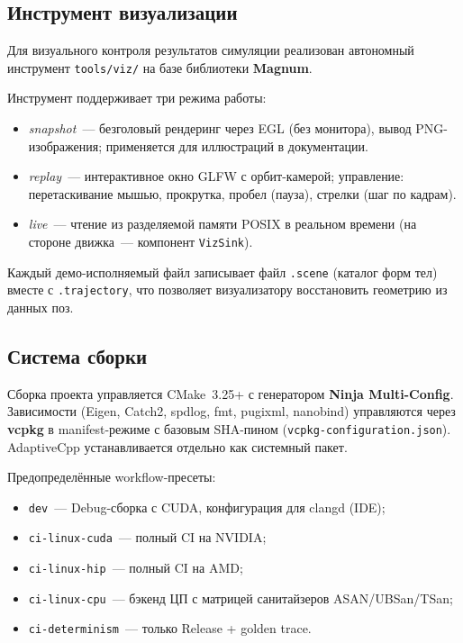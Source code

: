 \subsection{Инструмент визуализации}

Для визуального контроля результатов симуляции реализован автономный инструмент \texttt{tools/viz/} на базе 
библиотеки \textbf{Magnum}.

Инструмент поддерживает три режима работы:

\begin{itemize}
  \item \textit{snapshot}~--- безголовый рендеринг через EGL (без монитора),
    вывод PNG-изображения; применяется для иллюстраций в документации.
  \item \textit{replay}~--- интерактивное окно GLFW с орбит-камерой;
    управление: перетаскивание мышью, прокрутка, пробел (пауза), стрелки (шаг по кадрам).
  \item \textit{live}~--- чтение из разделяемой памяти POSIX в реальном времени
    (на стороне движка~--- компонент \texttt{VizSink}).
\end{itemize}

Каждый демо-исполняемый файл записывает файл \texttt{.scene} (каталог форм тел) вместе с \texttt{.trajectory}, 
что позволяет визуализатору восстановить геометрию из данных поз.

\subsection{Система сборки}

Сборка проекта управляется CMake~3.25+ с генератором \textbf{Ninja Multi-Config}. Зависимости (Eigen, Catch2, 
spdlog, fmt, pugixml, nanobind) управляются через \textbf{vcpkg} в manifest-режиме с базовым SHA-пином 
(\texttt{vcpkg-configuration.json}). AdaptiveCpp устанавливается отдельно как системный пакет.

Предопределённые workflow-пресеты:

\begin{itemize}
  \item \texttt{dev}~--- Debug-сборка с CUDA, конфигурация для clangd (IDE);
  \item \texttt{ci-linux-cuda}~--- полный CI на NVIDIA;
  \item \texttt{ci-linux-hip}~--- полный CI на AMD;
  \item \texttt{ci-linux-cpu}~--- бэкенд ЦП с матрицей санитайзеров ASAN/UBSan/TSan;
  \item \texttt{ci-determinism}~--- только Release + golden trace.
\end{itemize}

